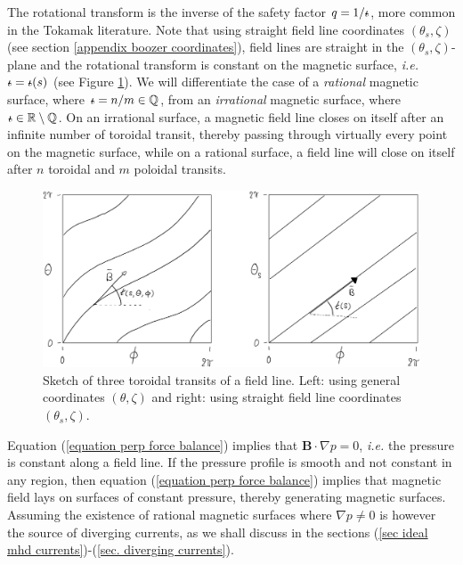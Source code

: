 \documentclass[my_thesis.tex]{subfiles}
\begin{document}
The rotational transform is the inverse of the safety factor $q=1/\text{$\iota\!\!$-}$, more common in the Tokamak literature. Note that using straight field line coordinates $(\theta_s,\zeta)$ (see section \ref{appendix boozer coordinates}), field lines are straight in the $(\theta_s,\zeta)$-plane and the rotational transform is constant on the magnetic surface, \textit{i.e.} $\text{$\iota\!\!$-}=\text{$\iota\!\!$-}(s)$ (see Figure \ref{fig sketch field line}). We will differentiate the case of a \emph{rational} magnetic surface, where $\text{$\iota\!\!$-}=n/m\in\mathbb{Q}$, from an \emph{irrational} magnetic surface, where $\text{$\iota\!\!$-}\in\mathbb{R}\setminus\mathbb{Q}$. On an irrational surface, a magnetic field line closes on itself after an infinite number of toroidal transit, thereby passing through virtually every point on the magnetic surface, while on a rational surface, a field line will close on itself after $n$ toroidal and $m$ poloidal transits.

\begin{figure}
	\centering
	\includegraphics[width=\linewidth]{images/SketchFieldLine-crop.pdf}
	\caption{Sketch of three toroidal transits of a field line. Left: using general coordinates $(\theta,\zeta)$ and right: using straight field line coordinates $(\theta_s,\zeta)$.}
	\label{fig sketch field line}
\end{figure}

Equation (\ref{equation perp force balance}) implies that $\mathbf{B}\cdot\nabla p=0$, \textit{i.e.} the pressure is constant along a field line. If the pressure profile is smooth and not constant in any region, then equation (\ref{equation perp force balance}) implies that magnetic field lays on surfaces of constant pressure, thereby generating magnetic surfaces. Assuming the existence of rational magnetic surfaces where $\nabla p\neq 0$ is however the source of diverging currents, as we shall discuss in the sections (\ref{sec ideal mhd currents})-(\ref{sec. diverging currents}). 
\end{document}
